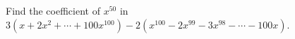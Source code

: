 Find the coefficient of $x^{50}$ in $3(x+2x^2+\cdots+100x^{100})-2(x^{100}-2x^{99}-3x^{98}-\cdots-100x)$.
